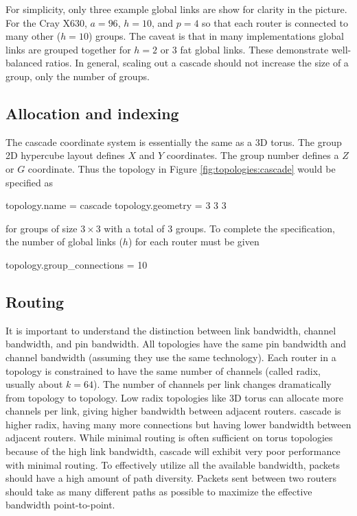For simplicity, only three example global links are show for clarity in the picture.
For the Cray X630, $a = 96$, $h=10$, and $p=4$ so that each router is connected to many other ($h=10$) groups.
The caveat is that in many implementations global links are grouped together for $h=2$ or $3$ fat global links.
These demonstrate well-balanced ratios.
In general, scaling out a cascade should not increase the size of a group, only the number of groups.

\subsection{Allocation and indexing}
\label{subsec:cascade:allocatoin}

The cascade coordinate system is essentially the same as a 3D torus.
The group 2D hypercube layout defines $X$ and $Y$ coordinates.
The group number defines a $Z$ or $G$ coordinate.
Thus the topology in Figure \ref{fig:topologies:cascade} would be specified as

\begin{ViFile}
topology.name = cascade
topology.geometry = 3 3 3
\end{ViFile}
for groups of size $3 \times 3$ with a total of 3 groups.
To complete the specification, the number of global links ($h$) for each router must be given

\begin{ViFile}
topology.group_connections = 10
\end{ViFile}

\subsection{Routing}
\label{subsec:cascade:routing}

It is important to understand the distinction between link bandwidth, channel bandwidth, and pin bandwidth.
All topologies have the same pin bandwidth and channel bandwidth (assuming they use the same technology).
Each router in a topology is constrained to have the same number of channels (called radix, usually about $k=64$).
The number of channels per link changes dramatically from topology to topology.
Low radix topologies like 3D torus can allocate more channels per link, 
giving higher bandwidth between adjacent routers.
cascade is higher radix, having many more connections but having lower bandwidth between adjacent routers.
While minimal routing is often sufficient on torus topologies because of the high link bandwidth,
cascade will exhibit very poor performance with minimal routing.
To effectively utilize all the available bandwidth, packets should have a high amount of path diversity.
Packets sent between two routers should take as many different paths as possible to maximize the effective bandwidth point-to-point.

